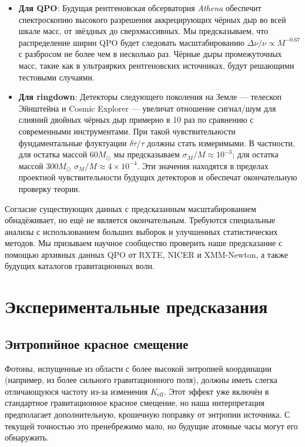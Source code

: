 \documentclass[12pt,a4paper]{article}
\newcommand{\Keff}{K_{\mathrm{eff}}}
\begin{document}
	\begin{itemize}
		\item \textbf{Для QPO}: Будущая рентгеновская обсерватория \textit{Athena} обеспечит спектроскопию высокого разрешения аккрецирующих чёрных дыр во всей шкале масс, от звёздных до сверхмассивных. Мы предсказываем, что распределение ширин QPO будет следовать масштабированию \(\Delta\nu/\nu \propto M^{-0.67}\) с разбросом не более чем в несколько раз. Чёрные дыры промежуточных масс, такие как в ультраярких рентгеновских источниках, будут решающими тестовыми случаями.
		
		\item \textbf{Для ringdown}: Детекторы следующего поколения на Земле — телескоп Эйнштейна и Cosmic Explorer — увеличат отношение сигнал/шум для слияний двойных чёрных дыр примерно в 10 раз по сравнению с современными инструментами. При такой чувствительности фундаментальные флуктуации \(\delta\tau/\tau\) должны стать измеримыми. В частности, для остатка массой \(60 M_\odot\) мы предсказываем \(\sigma_M/M \approx 10^{-3}\); для остатка массой \(300 M_\odot\) \(\sigma_M/M \approx 4 \times 10^{-4}\). Эти значения находятся в пределах проектной чувствительности будущих детекторов и обеспечат окончательную проверку теории.
	\end{itemize}
	
	Согласие существующих данных с предсказанным масштабированием обнадёживает, но ещё не является окончательным. Требуются специальные анализы с использованием больших выборок и улучшенных статистических методов. Мы призываем научное сообщество проверить наше предсказание с помощью архивных данных QPO от RXTE, NICER и XMM-Newton, а также будущих каталогов гравитационных волн.
	
	\section{Экспериментальные предсказания}
	\label{sec:predictions}
	
	\subsection{Энтропийное красное смещение}
	
	Фотоны, испущенные из области с более высокой энтропией координации (например, из более сильного гравитационного поля), должны иметь слегка отличающуюся частоту из-за изменения \(\Keff\). Этот эффект уже включён в стандартное гравитационное красное смещение, но наша интерпретация предполагает дополнительную, крошечную поправку от энтропии источника. С текущей точностью это пренебрежимо мало, но будущие атомные часы могут его обнаружить.
	
\end{document}
